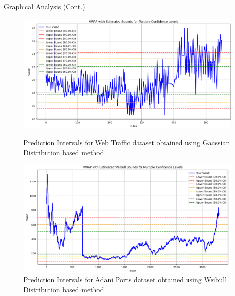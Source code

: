 \documentclass[xcolor=dvipsnames,aspectratio=169]{beamer}
\begin{document}
\begin{frame}{Graphical Analysis (Cont.)}

\begin{figure}
    \centering
    \begin{minipage}[b]{0.45\linewidth}
        \centering
        \includegraphics[width=\linewidth]{Gaussian_Web_Traffic.png}
        \caption{Prediction Intervals for Web Traffic dataset obtained using Gaussian Distribution based method.}
        \label{fig:asianpaints}
    \end{minipage}
    \hfill
    \begin{minipage}[b]{0.45\linewidth}
        \centering
        \includegraphics[width=\linewidth]{Weibull_AdaniPorts.png}
        \caption{Prediction Intervals for Adani Ports dataset obtained using Weibull Distribution based method.}
        \label{fig:adaniports}
    \end{minipage}
\end{figure}

\end{frame}
\end{document}
